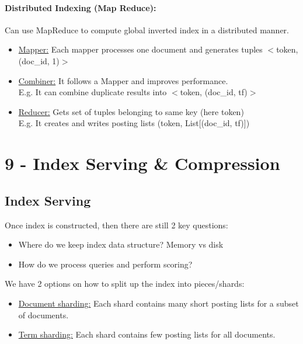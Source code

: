 \documentclass[a4paper,11pt]{article}
\newcommand{\msection}[1]{\section{#1}\vspace{-0.5mm}}
\begin{document}
\begin{multicols}{2}
\paragraph{Distributed Indexing (Map Reduce):} Can use MapReduce to compute global inverted index in a distributed manner.\\
\begin{itemize}
  \item \underline{Mapper:} Each mapper processes one document and generates tuples $<$token, (doc\_id, 1)$>$
  \item \underline{Combiner:} It follows a Mapper and improves performance.\\
        E.g. It can combine duplicate results into $<$token, (doc\_id, tf)$>$
  \item \underline{Reducer:} Gets set of tuples belonging to same key (here token)\\
        E.g. It creates and writes posting lists (token, List[(doc\_id, tf)])
\end{itemize}

\vfill
\columnbreak

\msection{9 - Index Serving \& Compression}
\subsection{Index Serving}
Once index is constructed, then there are still 2 key questions:
\begin{itemize}
  \item Where do we keep index data structure? Memory vs disk
  \item How do we process queries and perform scoring?
\end{itemize}

We have 2 options on how to split up the index into pieces/shards:
\begin{itemize}
  \item \underline{Document sharding:} Each shard contains many short posting lists for a subset of documents.
  \item \underline{Term sharding:} Each shard contains few posting lists for all documents.
\end{itemize}


\end{multicols}
\end{document}
